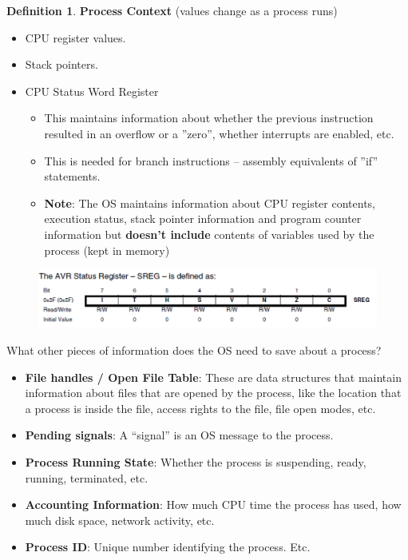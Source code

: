 \documentclass[11pt,a4paper]{article}
\theoremstyle{definition}
\newtheorem{definition}{Definition}[section]
\newenvironment{myitemize}
{ \begin{itemize}
    \setlength{\itemsep}{5pt}
    \setlength{\parskip}{0pt}
    \setlength{\parsep}{0pt}     }
{ \end{itemize}                  }
\begin{document}
\begin{definition}{\textbf{Process Context}} (values change as a process runs)
	\begin{myitemize}
		\item CPU register values. 
		\item Stack pointers.
		\item CPU Status Word Register
		\begin{myitemize}
			\item This maintains information about whether the previous instruction resulted in an overflow or a ''zero'', whether interrupts are enabled, etc.
			\item This is needed for branch instructions – assembly equivalents of ''if'' statements.
			\item \textbf{Note}: The OS maintains information about CPU register contents, execution status, stack pointer information and program counter information but \textbf{doesn't include} contents of variables used by the process (kept in memory)
		\end{myitemize}
	\end{myitemize}
\end{definition}

\begin{figure}[h!]
	\includegraphics[scale=0.6]{m1/statusRegister}
	\centering
\end{figure}

\begin{tcolorbox}
	\textsf{What other pieces of information does the OS need to save about a process?}
	
	\begin{myitemize}
		\item \textbf{File handles / Open File Table}: These are data structures that maintain information about files that are opened by the process, like the location that a process is inside the file, access rights to the file, file open modes, etc.
		\item \textbf{Pending signals}: A “signal” is an OS message to the process.
		\item \textbf{Process Running State}: Whether the process is suspending, ready, running, terminated, etc.
		\item \textbf{Accounting Information}: How much CPU time the process has used, how much disk space, network activity, etc.
		\item \textbf{Process ID}: Unique number identifying the process. Etc.
	\end{myitemize}
\end{tcolorbox}
\end{document}
